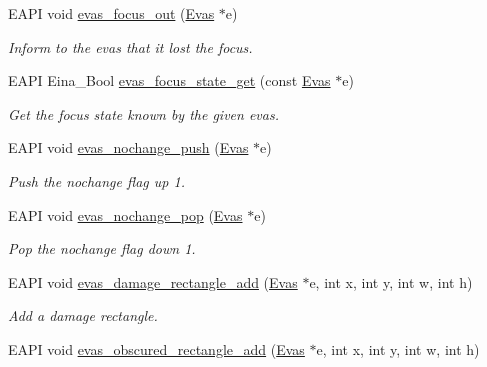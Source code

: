 \begin{DoxyCompactItemize}
EAPI void \hyperlink{group__Evas__Canvas_ga438b8a00339af4b25c84c4ef57d6b3ff}{evas\_\-focus\_\-out} (\hyperlink{group__Evas__Canvas_ga5ff87cc4ce6bc43e3b640a6d37f73043}{Evas} $\ast$e)
\begin{DoxyCompactList}\small\item\em Inform to the evas that it lost the focus. \item\end{DoxyCompactList}\item 
EAPI Eina\_\-Bool \hyperlink{group__Evas__Canvas_gab4822a733c10760b293006b77c4fc6d8}{evas\_\-focus\_\-state\_\-get} (const \hyperlink{group__Evas__Canvas_ga5ff87cc4ce6bc43e3b640a6d37f73043}{Evas} $\ast$e)
\begin{DoxyCompactList}\small\item\em Get the focus state known by the given evas. \item\end{DoxyCompactList}\item 
EAPI void \hyperlink{group__Evas__Canvas_ga6e49e2a2b27c306c265433ac7d3b5dbe}{evas\_\-nochange\_\-push} (\hyperlink{group__Evas__Canvas_ga5ff87cc4ce6bc43e3b640a6d37f73043}{Evas} $\ast$e)
\begin{DoxyCompactList}\small\item\em Push the nochange flag up 1. \item\end{DoxyCompactList}\item 
EAPI void \hyperlink{group__Evas__Canvas_gaa001b49fa2aa654ba0b116c6667b0fac}{evas\_\-nochange\_\-pop} (\hyperlink{group__Evas__Canvas_ga5ff87cc4ce6bc43e3b640a6d37f73043}{Evas} $\ast$e)
\begin{DoxyCompactList}\small\item\em Pop the nochange flag down 1. \item\end{DoxyCompactList}\item 
EAPI void \hyperlink{group__Evas__Canvas_ga91b68cf4090201f16aede8e4c124986d}{evas\_\-damage\_\-rectangle\_\-add} (\hyperlink{group__Evas__Canvas_ga5ff87cc4ce6bc43e3b640a6d37f73043}{Evas} $\ast$e, int x, int y, int w, int h)
\begin{DoxyCompactList}\small\item\em Add a damage rectangle. \item\end{DoxyCompactList}\item 
EAPI void \hyperlink{group__Evas__Canvas_gab731e13487e7a2bf6c39d1c1dc69ccc4}{evas\_\-obscured\_\-rectangle\_\-add} (\hyperlink{group__Evas__Canvas_ga5ff87cc4ce6bc43e3b640a6d37f73043}{Evas} $\ast$e, int x, int y, int w, int h)

\end{DoxyCompactItemize}

